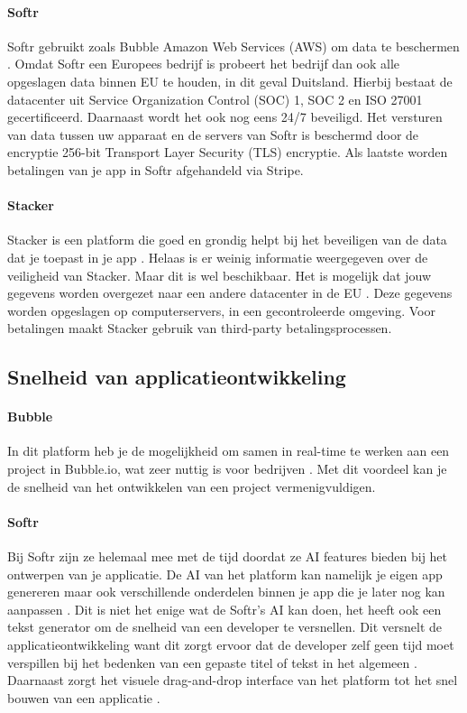 \paragraph{Softr}
Softr gebruikt zoals Bubble Amazon Web Services (AWS) om data te beschermen \autocite{Softr}. Omdat Softr een Europees bedrijf is probeert het bedrijf dan ook alle opgeslagen data binnen EU te houden, in dit geval Duitsland. Hierbij bestaat de datacenter uit Service Organization Control (SOC) 1, SOC 2 en ISO 27001 gecertificeerd. Daarnaast wordt het ook nog eens 24/7 beveiligd. Het versturen van data tussen uw apparaat en de servers van 
Softr is beschermd door de encryptie 256-bit Transport Layer Security (TLS) encryptie. Als laatste worden betalingen van je app in Softr afgehandeld via Stripe.
\paragraph{Stacker}
Stacker is een platform die goed en grondig helpt bij het beveiligen van de data dat je toepast in je app \autocite{JDN2023}.
 Helaas is er weinig informatie weergegeven over de veiligheid van Stacker. Maar dit is wel beschikbaar.
 Het is mogelijk dat jouw gegevens worden overgezet naar een andere datacenter in de EU \autocite{Stacker2023}. 
 Deze gegevens worden opgeslagen op computerservers, in een gecontroleerde omgeving. Voor betalingen maakt Stacker gebruik van third-party betalingsprocessen.
\subsection{Snelheid van applicatieontwikkeling}%
\label{subsec:snelheid-van-applicatieontwikkeling}
\paragraph{Bubble}
In dit platform heb je de mogelijkheid om samen in real-time te werken aan een project in Bubble.io, wat zeer nuttig is voor bedrijven \autocite{Bubble2024b}. 
Met dit voordeel kan je de snelheid van het ontwikkelen van een project vermenigvuldigen.
\paragraph{Softr}
Bij Softr zijn ze helemaal mee met de tijd doordat ze AI features bieden bij het ontwerpen van je applicatie. 
De AI van het platform kan namelijk je eigen app genereren maar ook verschillende onderdelen binnen je app 
die je later nog kan aanpassen \autocite{Frater2024}. Dit is niet het enige wat de Softr’s 
AI kan doen, het heeft ook een tekst generator om de snelheid van een developer te versnellen. 
Dit versnelt de applicatieontwikkeling want dit zorgt ervoor dat de developer zelf geen 
tijd moet verspillen bij het bedenken van een gepaste titel of tekst in het algemeen \autocite{Frater2024}. 
Daarnaast zorgt het visuele drag-and-drop interface van het platform tot het snel bouwen van een applicatie \autocite{Code2023}. 
